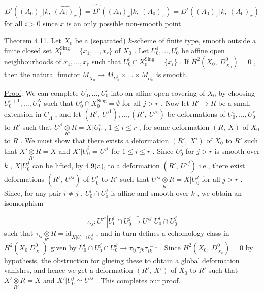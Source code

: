 $$D^i((A_0)_x|k,\ \widehat{(A_0)_x}) = \widehat{D^i}((A_0)_x|k,\ (A_0)_x) = D^i((A_0)_x|k,\ (A_0)_x)$$
for all  $i > 0$  since  $x$  is an only possible non-smooth point.

\underline{Theorem} 4.11.  \underline{Let}  $X_0$  \underline{be a} (\underline{separated}) $k$-\underline{scheme of finite type, smooth outside a finite closed set}  $X_0^{\mathrm{Sing}} = \{x_1,\dots,x_r\}$  \underline{of}  $X_0$ . \underline{Let}  $U_0^1,\dots,U_0^r$  \underline{be affine open neighbourhoods of}  $x_1,\dots,x_r$  \underline{such that}  $U_0^i \cap X_0^{\mathrm{Sing}} = \{x_i\}$ . \underline{If} $H^2(X_0,\ \underline{D}^0_{X_0}) = 0$ , \underline{then the natural functor}  $\underline{M}_{X_0} \to \underline{M}_{U_0^1} \times\dots\times \underline{M}_{U_0^r}$   \underline{is smooth.}

\underline{Proof}: We can complete  $U_0^1, \dots ,U_0^r$  into an affine open covering of  $X_0$  by choosing $U_0^{r+1},\dots,U_0^N$  such that   $U_0^j \cap X_0^{\mathrm{Sing}} = \emptyset$  for all  $j > r$ . Now let $R' \to R$  be a small extension in  $\underline{C}_{\Lambda}$ , and let  $(R',\ U'^1),\dots,(R',\ U'^r)$  be deformations of  $U_0^1,\dots,U_0^r$  to  $R'$  such that  $U'^i \underset{R'}{\otimes} R = X|U_0^i$ ,  $1 \le i \le r$ , for
some deformation  $(R,\ X)$  of  $X_0$  to  $R$ . We must show that there exists a deformation  $(R',\ X')$  of  $X_0$  to  $R'$  such that  $X' \underset{R'}{\otimes} R = X$  and  $X'|U_0^i = U'^i$  for $1 \le i \le r$ . Since  $U_0^j$  for  $j > r$  is smooth over  $k$ ,  $X|U_0^j$  can be lifted, by 4.9(a), to a deformation  $(R',\ U'^j)$  i.e., there exist deformations  $(R',\ U'^j)$ of  $U_0^j$  to  $R'$  such that  $U'^j \underset{R'}{\otimes} R = X|U_0^j$  for all  $j > r$ . Since, for any pair $i \ne j$ ,  $U_0^i \cap U_0^j$  is affine and smooth over  $k$ , we obtain an isomorphism

$$\tau_{ij} : U'^i|U_0^i \cap U_0^j \xrightarrow{\ \sim\ } U'^j|U_0^i \cap U_0^j$$
such that  $\tau_{ij} \underset{R'}{\otimes} R = \mathrm{id}_{X|U_0^i \cap U_0^j}$ , and in turn defines a cohomology class in $H^2(X_0\ \underline{D}^0_{X_0})$  given by  $U_0^i \cap U_0^j \cap U_0^k \to \tau_{ij}\tau_{jk}\tau_{ik}^{\ -1}$ . Since  $H^2(X_0,\ \underline{D}^0_{X_0}) = 0$  by hypothesis, the obstruction for glueing these to obtain a global deformation vanishes, and hence we get a deformation  $(R',\ X')$  of  $X_0$  to  $R'$  such that $X' \underset{R'}{\otimes} R = X$  and  $X'|U_0^j \simeq U'^j$ . This completes our proof.

